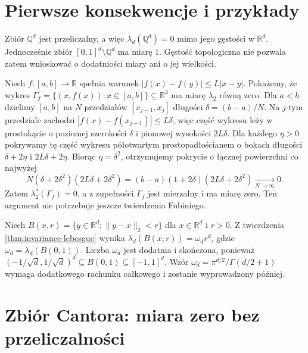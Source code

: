 \section{Pierwsze konsekwencje i przykłady}

\begin{przyklad}
Zbiór $\mathbb Q^d$ jest przeliczalny, a więc
$\lambda_d(\mathbb Q^d)=0$ mimo jego gęstości
w $\mathbb R^d$. Jednocześnie zbiór
$[0,1]^d\setminus\mathbb Q^d$ ma miarę $1$.
Gęstość topologiczna nie pozwala zatem wnioskować
o dodatniości miary ani o jej wielkości.
\end{przyklad}

\begin{przyklad}
\label{ex:lipschitz-graph-null}
Niech $f:[a,b]\to\mathbb R$ spełnia warunek
$|f(x)-f(y)|\le L|x-y|$.
Pokażemy, że wykres
$\Gamma_f=\{(x,f(x)):x\in[a,b]\}\subseteq\mathbb R^2$
ma miarę $\lambda_2$ równą zero.
Dla $a<b$ dzielimy $[a,b]$ na $N$ przedziałów
$[x_{j-1},x_j]$ długości $\delta=(b-a)/N$.
Na $j$-tym przedziale zachodzi
$|f(x)-f(x_{j-1})|\le L\delta$, więc część wykresu
leży w prostokącie o poziomej szerokości $\delta$
i pionowej wysokości $2L\delta$.
Dla każdego $\eta>0$ pokrywamy tę część wykresu
półotwartym prostopadłościanem o bokach długości
$\delta+2\eta$ i $2L\delta+2\eta$.
Biorąc $\eta=\delta^2$, otrzymujemy pokrycie o
łącznej powierzchni co najwyżej
\[
N(\delta+2\delta^2)(2L\delta+2\delta^2)
=(b-a)(1+2\delta)(2L\delta+2\delta^2)
\xrightarrow[N\to\infty]{}0.
\]
Zatem $\lambda_2^*(\Gamma_f)=0$, a z zupełności
$\Gamma_f$ jest mierzalny i ma miarę zero.
Ten argument nie potrzebuje jeszcze twierdzenia Fubiniego.
\end{przyklad}

\begin{przyklad}
Niech $B(x,r)=\{y\in\mathbb R^d:\|y-x\|_2<r\}$
dla $x\in\mathbb R^d$ i $r>0$.
Z twierdzenia \ref{thm:invariance-lebesgue}
wynika $\lambda_d(B(x,r))=\omega_dr^d$,
gdzie $\omega_d=\lambda_d(B(0,1))$.
Liczba $\omega_d$ jest dodatnia i skończona, ponieważ
$(-1/\sqrt d,1/\sqrt d)^d\subseteq B(0,1)
\subseteq[-1,1]^d$. Wzór
$\omega_d=\pi^{d/2}/\Gamma(d/2+1)$ wymaga dodatkowego
rachunku całkowego i zostanie wyprowadzony później.
\end{przyklad}

\section{Zbiór Cantora: miara zero bez przeliczalności}

